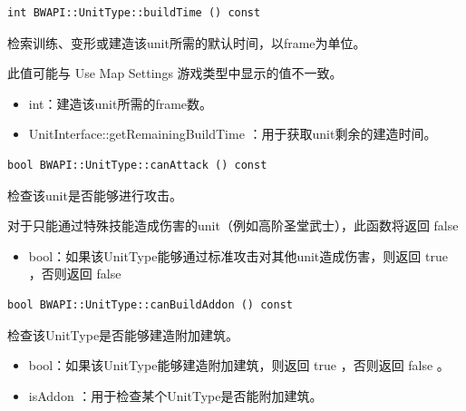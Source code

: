 \begin{tcolorbox}[colback=white, colframe=black!60!white, title=buildTime(), arc=0mm]
    \begin{verbatim}
int BWAPI::UnitType::buildTime () const
    \end{verbatim}
    检索训练、变形或建造该unit所需的默认时间，以frame为单位。
\begin{note}
    此值可能与 Use Map Settings 游戏类型中显示的值不一致。
\end{note}
\begin{return}
\begin{itemize}
    \item int：建造该unit所需的frame数。
\end{itemize}
\end{return}
\begin{refer}
\begin{itemize}
    \item UnitInterface::getRemainingBuildTime  ：用于获取unit剩余的建造时间。
\end{itemize}
\end{refer}
\end{tcolorbox}


\begin{tcolorbox}[colback=white, colframe=black!60!white, title=canAttack(), arc=0mm]
    \begin{verbatim}
bool BWAPI::UnitType::canAttack () const
    \end{verbatim}
    检查该unit是否能够进行攻击。
\begin{note}
    对于只能通过特殊技能造成伤害的unit（例如高阶圣堂武士），此函数将返回   false
\end{note}
\begin{return}
\begin{itemize}
    \item bool：如果该UnitType能够通过标准攻击对其他unit造成伤害，则返回   true  ，否则返回   false
\end{itemize}
\end{return}
\end{tcolorbox}


\begin{tcolorbox}[colback=white, colframe=black!60!white, title=canBuildAddon(), arc=0mm]
    \begin{verbatim}
bool BWAPI::UnitType::canBuildAddon () const
    \end{verbatim}
    检查该UnitType是否能够建造附加建筑。
\begin{return}
\begin{itemize}
    \item bool：如果该UnitType能够建造附加建筑，则返回   true  ，否则返回   false  。
\end{itemize}
\end{return}
\begin{refer}
\begin{itemize}
    \item isAddon  ：用于检查某个UnitType是否能附加建筑。
\end{itemize}
\end{refer}
\end{tcolorbox}


